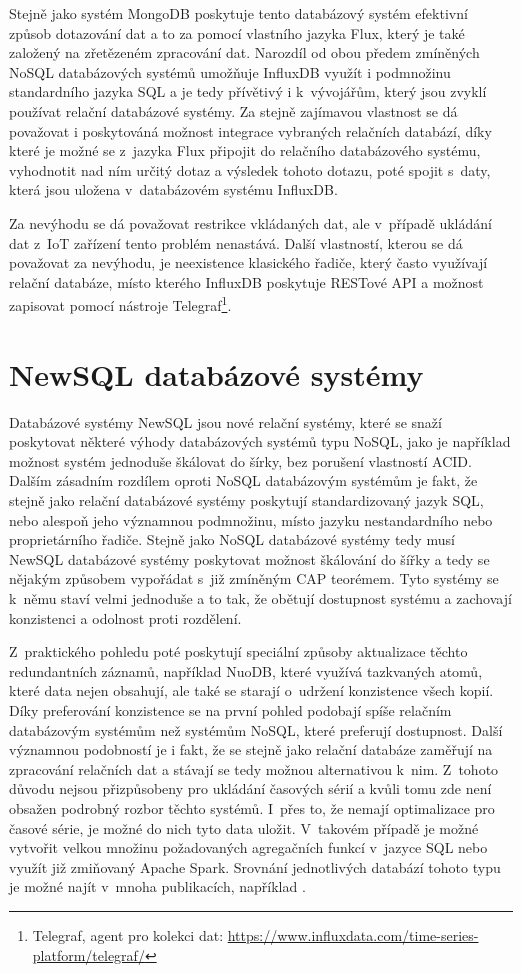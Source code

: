 Stejně jako systém MongoDB poskytuje tento databázový systém efektivní způsob dotazování dat a to za pomocí vlastního jazyka Flux, který je také založený na zřetězeném zpracování dat. Narozdíl od obou předem zmíněných NoSQL databázových systémů umožňuje InfluxDB využít i podmnožinu standardního jazyka SQL a je tedy přívětivý i k~vývojářům, který jsou zvyklí používat relační databázové systémy. Za stejně zajímavou vlastnost se dá považovat i poskytováná možnost integrace vybraných relačních databází, díky které je možné se z~jazyka Flux připojit do relačního databázového systému, vyhodnotit nad ním určitý dotaz a výsledek tohoto dotazu, poté spojit s~daty, která jsou uložena v~databázovém systému InfluxDB. 

Za nevýhodu se dá považovat restrikce vkládaných dat, ale v~případě ukládání dat z~IoT zařízení tento problém nenastává. Další vlastností, kterou se dá považovat za nevýhodu, je neexistence klasického řadiče, který často využívají relační databáze, místo kterého InfluxDB poskytuje RESTové API a možnost zapisovat pomocí nástroje Telegraf\footnote{Telegraf, agent pro kolekci dat: \url{https://www.influxdata.com/time-series-platform/telegraf/}}.

\section{NewSQL databázové systémy}
Databázové systémy NewSQL jsou nové relační systémy, které se snaží poskytovat některé výhody databázových systémů typu NoSQL, jako je například možnost systém jednoduše škálovat do šírky, bez porušení vlastností ACID. Dalším zásadním rozdílem oproti NoSQL databázovým systémům je fakt, že stejně jako relační databázové systémy poskytují standardizovaný jazyk SQL, nebo alespoň jeho významnou podmnožinu, místo jazyku nestandardního nebo proprietárního řadiče. Stejně jako NoSQL databázové systémy tedy musí NewSQL databázové systémy poskytovat možnost škálování do šířky a tedy se nějakým způsobem vypořádat s~již zmíněným CAP teorémem. Tyto systémy se k~němu staví velmi jednoduše a to tak, že obětují dostupnost systému a zachovají konzistenci a odolnost proti rozdělení.

Z~praktického pohledu poté poskytují speciální způsoby aktualizace těchto redundantních záznamů, například NuoDB, které využívá tazkvaných atomů, které data nejen obsahují, ale také se starají o~udržení konzistence všech kopií. Díky preferování konzistence se na první pohled podobají spíše relačním databázovým systémům než systémům NoSQL, které preferují dostupnost. Další významnou podobností je i fakt, že se stejně jako relační databáze zaměřují na zpracování relačních dat a stávají se tedy možnou alternativou k~nim. Z~tohoto důvodu nejsou přizpůsobeny pro ukládání časových sérií a kvůli tomu zde není obsažen podrobný rozbor těchto systémů. I~přes to, že nemají optimalizace pro časové série, je možné do nich tyto data uložit. V~takovém případě je možné vytvořit velkou množinu požadovaných agregačních funkcí v~jazyce SQL nebo využít již zmiňovaný Apache Spark. Srovnání jednotlivých databází tohoto typu je možné najít v~mnoha publikacích, například \cite{8068585, 9078970}.

